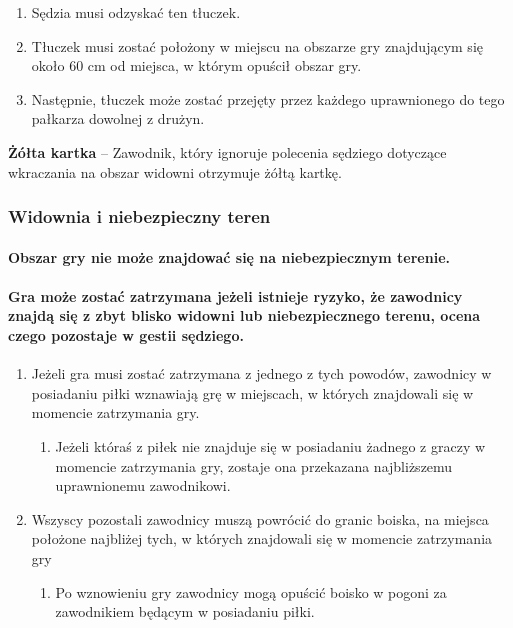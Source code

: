 \documentclass[12pt]{article}
\newcommand\yellowcard[1]{\bgroup\textcolor{darkyellow}{\textbf{#1}}}
\begin{document}
\begin{enumerate}
\begin{enumerate}
		            \begin{enumerate}
			            \item
			                  Sędzia musi odzyskać ten tłuczek.
			            \item
			                  Tłuczek musi zostać położony w miejscu na obszarze gry znajdującym
			                  się około 60 cm od miejsca, w którym opuścił obszar gry.
			            \item
			                  Następnie, tłuczek może zostać przejęty przez każdego uprawnionego
			                  do tego pałkarza dowolnej z drużyn.
		            \end{enumerate}
	      \end{enumerate}
\end{enumerate}

\yellowcard{Żółta kartka} -- Zawodnik, który ignoruje polecenia sędziego
dotyczące wkraczania na obszar widowni otrzymuje żółtą kartkę.

\subsubsection{Widownia i niebezpieczny teren}

\paragraph{Obszar gry nie może znajdować się na niebezpiecznym terenie.}

\paragraph{Gra może zostać zatrzymana jeżeli istnieje ryzyko, że
	zawodnicy znajdą się z zbyt blisko widowni lub niebezpiecznego terenu,
	ocena czego pozostaje w gestii sędziego.}

\begin{enumerate}
	\item
	      Jeżeli gra musi zostać zatrzymana z jednego z tych powodów, zawodnicy
	      w posiadaniu piłki wznawiają grę w miejscach, w których znajdowali się
	      w momencie zatrzymania gry.

	      \begin{enumerate}
		      \item
		            Jeżeli któraś z piłek nie znajduje się w posiadaniu żadnego z graczy
		            w momencie zatrzymania gry, zostaje ona przekazana najbliższemu
		            uprawnionemu zawodnikowi.
	      \end{enumerate}
	\item
	      Wszyscy pozostali zawodnicy muszą powrócić do granic boiska, na
	      miejsca położone najbliżej tych, w których znajdowali się w momencie
	      zatrzymania gry

	      \begin{enumerate}
		      \item
		            Po wznowieniu gry zawodnicy mogą opuścić boisko w pogoni za
		            zawodnikiem będącym w posiadaniu piłki.
	      \end{enumerate}
\end{enumerate}
\end{document}
